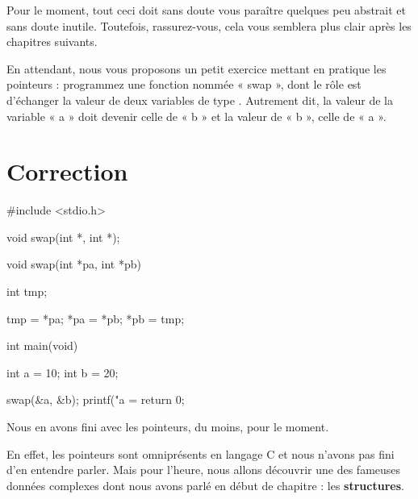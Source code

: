 Pour le moment, tout ceci doit sans doute vous paraître quelques peu 
abstrait et sans doute inutile. Toutefois, rassurez-vous, cela vous semblera
plus clair après les chapitres suivants.

En attendant, nous vous proposons un petit exercice mettant en pratique
les pointeurs : programmez une fonction nommée « swap », dont le rôle
est d'échanger la valeur de deux variables de type .
Autrement dit, la valeur de la variable « a » doit devenir celle de « b
» et la valeur de « b », celle de « a ».

\section{Correction}
\label{correction-14}

\begin{C}
 #include <stdio.h>

void swap(int *, int *);


void swap(int *pa, int *pb)
{
    int tmp;

    tmp = *pa;
    *pa = *pb;
    *pb = tmp;
}


int main(void)
{
    int a = 10;
    int b = 20;

    swap(&a, &b);
    printf("a = %
    return 0;
}
\end{C}

\hrulefill

Nous en avons fini avec les pointeurs, du moins, pour le moment.

En effet, les pointeurs sont omniprésents en langage C et nous n'avons
pas fini d'en entendre parler. Mais pour l'heure, nous allons découvrir
une des fameuses données complexes dont nous avons parlé en début de
chapitre : les \textbf{structures}.